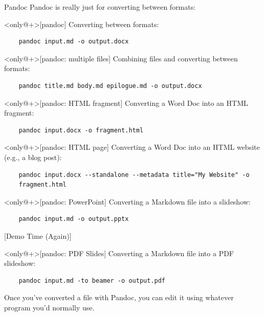 \begin{frame}[fragile]{Pandoc}
  Pandoc is really just for converting between formats:
  \vfill
  \begin{example}<only@+>[pandoc]
    Converting between formats:
    \begin{verbatim}
    pandoc input.md -o output.docx
    \end{verbatim}
  \end{example}
  \begin{example}<only@+>[pandoc: multiple files]
    Combining files and converting between formats:
    \begin{verbatim}
    pandoc title.md body.md epilogue.md -o output.docx
    \end{verbatim}
  \end{example}
  \begin{example}<only@+>[pandoc: HTML fragment]
    Converting a Word Doc into an HTML fragment:
    \begin{verbatim}
    pandoc input.docx -o fragment.html
    \end{verbatim}
  \end{example}
  \begin{example}<only@+>[pandoc: HTML page]
    Converting a Word Doc into an HTML website (e.g., a blog post):
    \begin{verbatim}
    pandoc input.docx --standalone --metadata title="My Website" -o
    fragment.html
    \end{verbatim}
  \end{example}
  \begin{example}<only@+>[pandoc: PowerPoint]
    Converting a Markdown file into a slideshow:
    \begin{verbatim}
    pandoc input.md -o output.pptx
    \end{verbatim}
    \begin{center}
      [Demo Time (Again)]
    \end{center}
  \end{example}
  \begin{example}<only@+>[pandoc: PDF Slides]
    Converting a Markdown file into a PDF slideshow:
    \begin{verbatim}
    pandoc input.md -to beamer -o output.pdf
    \end{verbatim}
  \end{example}
  \vfill
  Once you've converted a file with Pandoc, you can edit it using
  whatever program you'd normally use.
\end{frame}

